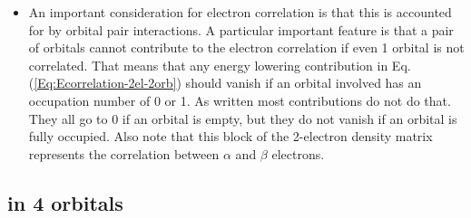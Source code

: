 \documentclass[aip,graphicx]{revtex4-1}
\begin{document}
\begin{itemize}
\begin{eqnarray}
\begin{matrix}
         \end{matrix}\right)
        \end{eqnarray}
\item An important consideration for electron correlation is that this is accounted for by orbital pair
         interactions. A particular important feature is that a pair of orbitals cannot contribute to the electron
         correlation if even 1 orbital is not correlated. That means that any energy lowering contribution in 
         Eq.(\ref{Eq:Ecorrelation-2el-2orb}) should vanish if an orbital involved has an occupation number
         of 0 or 1. As written most contributions do not do that. They all go to 0 if an orbital is empty, but
         they do not vanish if an orbital is fully occupied. Also note that this block of the 2-electron density 
         matrix represents the correlation between $\alpha$ and $\beta$ electrons.
\end{itemize}

\subsection{ in 4 orbitals}
\label{Subsect:h2-4orb}
\end{document}
